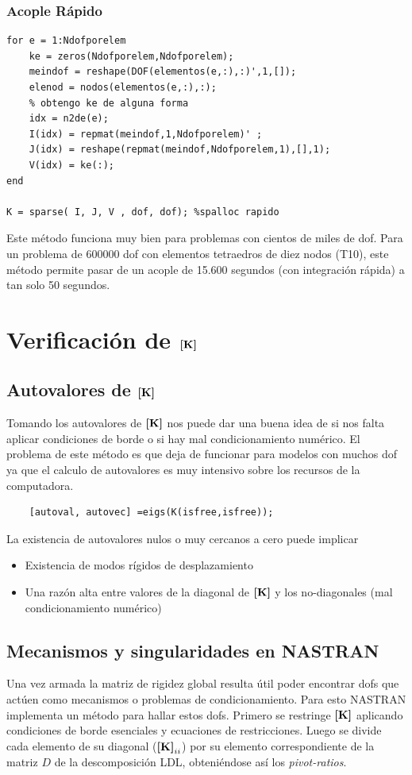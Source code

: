 \subsubsection*{Acople Rápido}
\begin{lstlisting}[caption = {Aplicación del método de acople rápido de la matriz de rigidez.}]
for e = 1:Ndofporelem
    ke = zeros(Ndofporelem,Ndofporelem);
    meindof = reshape(DOF(elementos(e,:),:)',1,[]);
    elenod = nodos(elementos(e,:),:);
    % obtengo ke de alguna forma
    idx = n2de(e);
    I(idx) = repmat(meindof,1,Ndofporelem)' ;
    J(idx) = reshape(repmat(meindof,Ndofporelem,1),[],1);
    V(idx) = ke(:);
end

K = sparse( I, J, V , dof, dof); %spalloc rapido
\end{lstlisting}

Este método funciona muy bien para problemas con cientos de miles de dof. Para un problema de 600000 dof con elementos tetraedros de diez nodos (T10), este método permite pasar de un acople de 15.600 segundos (con integración rápida) a tan solo 50 segundos.

\section{Verificación de \(\boldsymbol{[}\mathbf{K} \boldsymbol{]} \)}
\subsection*{Autovalores de $\boldsymbol{[}\mathbf{K} \boldsymbol{]}$}
Tomando los autovalores de $\boldsymbol{[}\mathbf{K} \boldsymbol{]}$ nos puede dar una buena idea de si nos falta aplicar condiciones de borde o si hay mal condicionamiento numérico. El problema de este método es que deja de funcionar para modelos con muchos dof ya que el calculo de autovalores es muy intensivo sobre los recursos de la computadora.
\begin{lstlisting}
    [autoval, autovec] =eigs(K(isfree,isfree));
\end{lstlisting}

La existencia de autovalores nulos o muy cercanos a cero puede implicar 
\begin{itemize}
    \item Existencia de modos rígidos de desplazamiento
    \item Una razón alta entre valores de la diagonal de $\boldsymbol{[}\mathbf{K} \boldsymbol{]}$ y los no-diagonales (mal condicionamiento numérico)
\end{itemize}
\subsection*{Mecanismos y singularidades en NASTRAN}
Una vez armada la matriz de rigidez global resulta útil poder encontrar dofs que actúen como mecanismos o problemas de condicionamiento. Para esto NASTRAN implementa un método para hallar estos dofs. Primero se restringe \(\boldsymbol{[}\mathbf{K} \boldsymbol{]} \) aplicando condiciones de borde esenciales y ecuaciones de restricciones. Luego se divide cada elemento de su diagonal ($\boldsymbol{[}\mathbf{K} \boldsymbol{]}_{ii}$) por su elemento correspondiente de la matriz $D$ de la descomposición LDL, obteniéndose así los \textit{pivot-ratios}.

